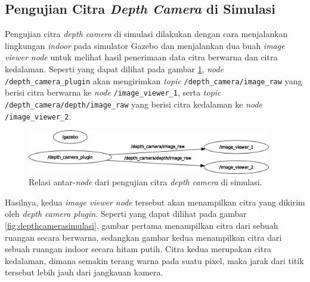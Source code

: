 \subsection{Pengujian Citra \emph{Depth Camera} di Simulasi}
\label{subsec:citradepthsimulasi}

Pengujian citra \emph{depth camera} di simulasi dilakukan dengan cara menjalankan lingkungan \emph{indoor} pada simulator Gazebo dan menjalankan dua buah \emph{image viewer node} untuk melihat hasil penerimaan data citra berwarna dan citra kedalaman.
Seperti yang dapat dilihat pada gambar \ref{fig:rosgraphdepthcameraplugin},
  \emph{node} \lstinline{/depth_camera_plugin} akan mengirimkan \emph{topic} \lstinline{/depth_camera/image_raw} yang berisi citra berwarna ke \emph{node} \lstinline{/image_viewer_1},
  serta \emph{topic} \lstinline{/depth_camera/depth/image_raw} yang berisi citra kedalaman ke \emph{node} \lstinline{/image_viewer_2}.

\begin{figure}[ht]
  \centering
  \includegraphics[width=0.95\textwidth,keepaspectratio]{gambar/rosgraph-depth-camera-plugin.png}
  \caption{Relasi antar-\emph{node} dari pengujian citra \emph{depth camera} di simulasi.}
  \label{fig:rosgraphdepthcameraplugin}
\end{figure}

Hasilnya, kedua \emph{image viewer node} tersebut akan menampilkan citra yang dikirim oleh \emph{depth camera plugin}.
Seperti yang dapat dilihat pada gambar \ref{fig:depthcamerasimulasi},
  gambar pertama menampilkan citra dari sebuah ruangan secara berwarna,
  sedangkan gambar kedua menampilkan citra dari sebuah ruangan indoor secara hitam putih.
Citra kedua merupakan citra kedalaman, dimana semakin terang warna pada suatu pixel,
  maka jarak dari titik tersebut lebih jauh dari jangkauan kamera.

